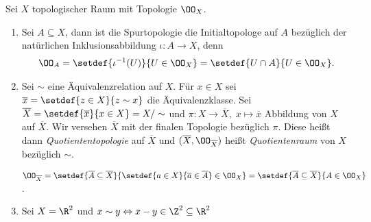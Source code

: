 \begin{bsp}
\label{bsp:1.3.3}
Sei $X$ topologischer Raum mit Topologie $\OO_X$.
\begin{enumerate}
  \item Sei $A\subseteq X$, dann ist die Spurtopologie die Initialtopologe
  auf $A$ bezüglich der natürlichen Inklusionsabbildung $\iota: A\to X$, denn
  \begin{align*}
  \OO_A = \setdef{\iota^{-1}(U)}{U\in \OO_X} = \setdef{U\cap A}{U\in\OO_X}.
  \end{align*}
  \item
  \begin{defnn} Sei $\sim$ eine Äquivalenzrelation auf $X$. Für $x\in X$ sei
  $\overline{x} = \setdef{z\in X}{z\sim x}$ die Äquivalenzklasse. Sei
  $\overline{X} = \setdef{\overline{x}}{x\in X} = X/\sim$ und $\pi: X\to 
  \overline{X},\;x\mapsto \overline{x}$ Abbildung von $X$ auf
  $\overline{X}$. Wir versehen $\overline{X}$ mit der finalen Topologie
  bezüglich $\pi$. Diese heißt dann \emph{Quotiententopologie} auf
  $\overline{X}$ und $(\overline{X},\OO_{\overline{X}})$ heißt
  \emph{Quotientenraum} von $X$ bezüglich $\sim$.
\end{defnn}
  \begin{bemn}[Beachte:]
  $\OO_{\overline{X}} = \setdef{\overline{A}\subseteq \overline{X}}{\setdef{a\in
  X}{\overline{a}\in\overline{A}}\in\OO_X} =
  \setdef{\overline{A}\subseteq \overline{X}}{A\in\OO_X}$.
  \end{bemn}
  \item Sei $X=\R^2$ und $x\sim y \Leftrightarrow x-y \in \Z^2\subseteq \R^2$
  \bsphere
\end{enumerate}
\end{bsp}

